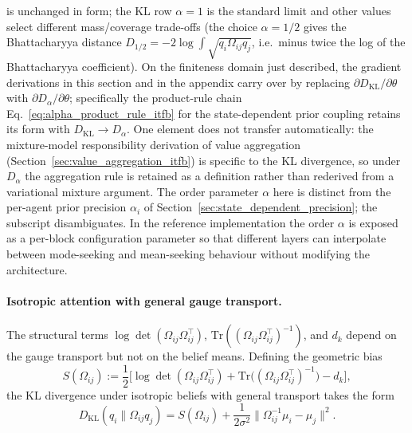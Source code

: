 \documentclass[11pt]{article}
\begin{document}
is unchanged in form; the KL row $\alpha = 1$ is the standard limit and other values select different mass/coverage trade-offs (the choice $\alpha = 1/2$ gives the Bhattacharyya distance $D_{1/2} = -2\log\int\sqrt{q_i \Omega_{ij}q_j}$, i.e.\ minus twice the log of the Bhattacharyya coefficient). On the finiteness domain just described, the gradient derivations in this section and in the appendix carry over by replacing $\partial D_{\mathrm{KL}}/\partial \theta$ with $\partial D_\alpha/\partial \theta$; specifically the product-rule chain Eq.~\eqref{eq:alpha_product_rule_itfb} for the state-dependent prior coupling retains its form with $D_{\mathrm{KL}} \to D_\alpha$. One element does not transfer automatically: the mixture-model responsibility derivation of value aggregation (Section~\ref{sec:value_aggregation_itfb}) is specific to the KL divergence, so under $D_\alpha$ the aggregation rule is retained as a definition rather than rederived from a variational mixture argument. The order parameter $\alpha$ here is distinct from the per-agent prior precision $\alpha_i$ of Section~\ref{sec:state_dependent_precision}; the subscript disambiguates. In the reference implementation the order $\alpha$ is exposed as a per-block configuration parameter so that different layers can interpolate between mode-seeking and mean-seeking behaviour without modifying the architecture.

\paragraph{Isotropic attention with general gauge transport.}

The structural terms $\log\det(\Omega_{ij}\Omega_{ij}^\top)$, $\mathrm{Tr}((\Omega_{ij}\Omega_{ij}^\top)^{-1})$, and $d_k$ depend on the gauge transport but not on the belief means. Defining the geometric bias
\begin{equation}
S(\Omega_{ij}) := \frac{1}{2}\Big[\log\det(\Omega_{ij}\Omega_{ij}^\top) + \mathrm{Tr}\big((\Omega_{ij}\Omega_{ij}^\top)^{-1}\big) - d_k\Big],
\end{equation}
the KL divergence under isotropic beliefs with general transport takes the form
\begin{equation}
D_{\mathrm{KL}}(q_i \| \Omega_{ij} q_j) = S(\Omega_{ij}) + \frac{1}{2\sigma^2}\|\Omega_{ij}^{-1}\mu_i - \mu_j\|^2.
\end{equation}
\end{document}

